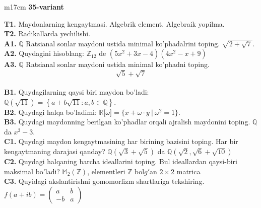 \documentclass{article}
\begin{document}
\begin{tabular}{m{17cm}}
\textbf{35-variant}
\newline

\textbf{T1.} Maydonlarning kengaytmasi. Algebrik element. Algebraik yopilma. \\
\textbf{T2.} Radikallarda yechilishi. \\
\textbf{A1.} \(\mathbb{Q}\) Ratsianal sonlar maydoni ustida minimal ko'phadalrini toping.
\(\sqrt{2 + \sqrt{7}}\). \\
\textbf{A2.} Quydagini hisoblang:
\(\mathbb{Z}_{12}\) de \(\left( 5x^{2} + 3x - 4 \right)\left( 4x^{2} - x + 9 \right)\) \\
\textbf{A3.} \(\mathbb{Q}\) Ratsianal sonlar maydoni ustida minimal ko'phadni toping.
\[\sqrt{5} + \sqrt{7}\] \\
\textbf{B1.} Quydagilarning qaysi biri maydon bo'ladi:
\(\mathbb{Q}\left( \sqrt{11} \right) = \left\{ a + b\sqrt{11}:a,b \in \mathbb{Q} \right\}\). \\
\textbf{B2.} Quydagi halqa bo'ladimi:
\(\mathbb{R\lbrack}\omega\rbrack = \{ x + \omega \cdot y\ |\ \omega^{2} = 1\}\). \\
\textbf{B3.} Quydagi maydonning berilgan ko'phadlar orqali ajralish maydonini toping.
\(\mathbb{Q}\) da \(x^{3} - 3\). \\
\textbf{C1.} Quydagi maydon kengaytmasining har birining bazisini toping. Har bir kengaytmaning darajasi qanday?
\(\mathbb{Q}\left( \sqrt{3} + \sqrt{5} \right)\) da \(\mathbb{Q}\left( \sqrt{2},\sqrt{6} + \sqrt{10} \right)\) \\
\textbf{C2.} Quydagi halqaning barcha ideallarini toping. Bul ideallardan qaysi-biri maksimal bo'ladi?
\(\mathbb{M}_{2}\left( \mathbb{Z} \right)\), elementleri \(\mathbb{Z}\) bol\(g'\)an \(2 \times 2\) matrica \\
\textbf{C3.} Quyidagi akslantirishni gomomorfizm shartlariga tekshiring. \(f(a + ib) = \begin{pmatrix}
a & b \\
 - b & a
\end{pmatrix}\) \\

\end{tabular}
\vspace{1cm}
\end{document}
